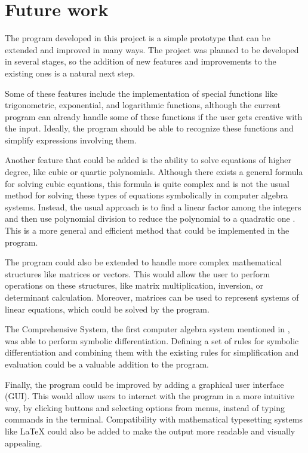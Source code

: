 \section{Future work}\label{sec:future-work}

The program developed in this project is a simple prototype that can be extended and improved in many ways. The project was planned to be developed in several stages, so the addition of new features and improvements to the existing ones is a natural next step.

Some of these features include the implementation of special functions like trigonometric, exponential, and logarithmic functions, although the current program can already handle some of these functions if the user gets creative with the input. Ideally, the program should be able to recognize these functions and simplify expressions involving them.

Another feature that could be added is the ability to solve equations of higher degree, like cubic or quartic polynomials. Although there exists a general formula for solving cubic equations, this formula is quite complex and is not the usual method for solving these types of equations symbolically in computer algebra systems. Instead, the usual approach is to find a linear factor among the integers and then use polynomial division to reduce the polynomial to a quadratic one \parencite{davenport1994computer}. This is a more general and efficient method that could be implemented in the program.

The program could also be extended to handle more complex mathematical structures like matrices or vectors. This would allow the user to perform operations on these structures, like matrix multiplication, inversion, or determinant calculation. Moreover, matrices can be used to represent systems of linear equations, which could be solved by the program.

The Comprehensive System, the first computer algebra system mentioned in , was able to perform symbolic differentiation. Defining a set of rules for symbolic differentiation and combining them with the existing rules for simplification and evaluation could be a valuable addition to the program.

Finally, the program could be improved by adding a graphical user interface (GUI). This would allow users to interact with the program in a more intuitive way, by clicking buttons and selecting options from menus, instead of typing commands in the terminal. Compatibility with mathematical typesetting systems like \LaTeX{} could also be added to make the output more readable and visually appealing.

